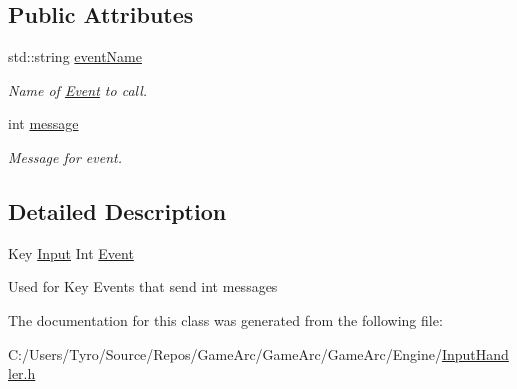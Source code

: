 \subsection*{Public Attributes}
\begin{DoxyCompactItemize}
\item 
\mbox{\label{class_key_input_int_event_a6ea3160018f034b15636b45bce09a965}} 
std\+::string \mbox{\hyperlink{class_key_input_int_event_a6ea3160018f034b15636b45bce09a965}{event\+Name}}
\begin{DoxyCompactList}\small\item\em Name of \mbox{\hyperlink{class_event}{Event}} to call. \end{DoxyCompactList}\item 
\mbox{\label{class_key_input_int_event_ad735d931dc2b63b235460f3de2d32490}} 
int \mbox{\hyperlink{class_key_input_int_event_ad735d931dc2b63b235460f3de2d32490}{message}}
\begin{DoxyCompactList}\small\item\em Message for event. \end{DoxyCompactList}\end{DoxyCompactItemize}


\subsection{Detailed Description}
Key \mbox{\hyperlink{class_input}{Input}} Int \mbox{\hyperlink{class_event}{Event}}

Used for Key Events that send int messages 

The documentation for this class was generated from the following file\+:\begin{DoxyCompactItemize}
\item 
C\+:/\+Users/\+Tyro/\+Source/\+Repos/\+Game\+Arc/\+Game\+Arc/\+Game\+Arc/\+Engine/\mbox{\hyperlink{_input_handler_8h}{Input\+Handler.\+h}}\end{DoxyCompactItemize}
